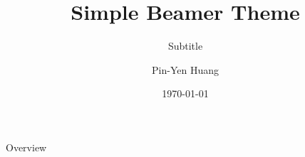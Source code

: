 \documentclass[aspectratio=169,xcolor=dvipsnames]{beamer}
\title[short title]{Simple Beamer Theme}
\subtitle{Subtitle}
\author[Pin-Yen] {Pin-Yen Huang}
\institute[NTU] %
{
    Department of Computer Science and Information Engineering \\
    National Taiwan University 
    \vskip 3pt
}
\date{\today} %
\begin{document}
\begin{frame}
    \titlepage
\end{frame}

\begin{frame}{Overview}
    \tableofcontents
\end{frame}

\end{document}
